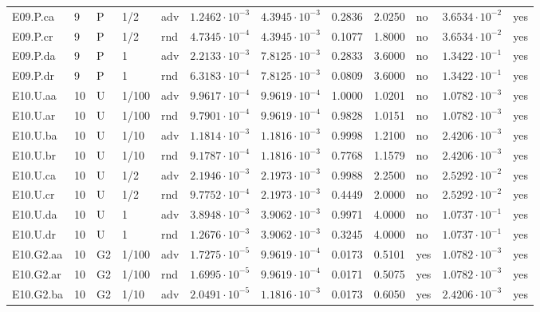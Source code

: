 {\begin{longtable}{@{}lllllllllll l@{}}
E09.P.ca & 9 & P & 1/2 & adv & $1.2462\cdot 10^{-3}$ & $4.3945\cdot 10^{-3}$ & 0.2836 & 2.0250 & no & $3.6534\cdot 10^{-2}$ & yes \\
E09.P.cr & 9 & P & 1/2 & rnd & $4.7345\cdot 10^{-4}$ & $4.3945\cdot 10^{-3}$ & 0.1077 & 1.8000 & no & $3.6534\cdot 10^{-2}$ & yes \\
E09.P.da & 9 & P & 1 & adv & $2.2133\cdot 10^{-3}$ & $7.8125\cdot 10^{-3}$ & 0.2833 & 3.6000 & no & $1.3422\cdot 10^{-1}$ & yes \\
E09.P.dr & 9 & P & 1 & rnd & $6.3183\cdot 10^{-4}$ & $7.8125\cdot 10^{-3}$ & 0.0809 & 3.6000 & no & $1.3422\cdot 10^{-1}$ & yes \\
E10.U.aa & 10 & U & 1/100 & adv & $9.9617\cdot 10^{-4}$ & $9.9619\cdot 10^{-4}$ & 1.0000 & 1.0201 & no & $1.0782\cdot 10^{-3}$ & yes \\
E10.U.ar & 10 & U & 1/100 & rnd & $9.7901\cdot 10^{-4}$ & $9.9619\cdot 10^{-4}$ & 0.9828 & 1.0151 & no & $1.0782\cdot 10^{-3}$ & yes \\
E10.U.ba & 10 & U & 1/10 & adv & $1.1814\cdot 10^{-3}$ & $1.1816\cdot 10^{-3}$ & 0.9998 & 1.2100 & no & $2.4206\cdot 10^{-3}$ & yes \\
E10.U.br & 10 & U & 1/10 & rnd & $9.1787\cdot 10^{-4}$ & $1.1816\cdot 10^{-3}$ & 0.7768 & 1.1579 & no & $2.4206\cdot 10^{-3}$ & yes \\
E10.U.ca & 10 & U & 1/2 & adv & $2.1946\cdot 10^{-3}$ & $2.1973\cdot 10^{-3}$ & 0.9988 & 2.2500 & no & $2.5292\cdot 10^{-2}$ & yes \\
E10.U.cr & 10 & U & 1/2 & rnd & $9.7752\cdot 10^{-4}$ & $2.1973\cdot 10^{-3}$ & 0.4449 & 2.0000 & no & $2.5292\cdot 10^{-2}$ & yes \\
E10.U.da & 10 & U & 1 & adv & $3.8948\cdot 10^{-3}$ & $3.9062\cdot 10^{-3}$ & 0.9971 & 4.0000 & no & $1.0737\cdot 10^{-1}$ & yes \\
E10.U.dr & 10 & U & 1 & rnd & $1.2676\cdot 10^{-3}$ & $3.9062\cdot 10^{-3}$ & 0.3245 & 4.0000 & no & $1.0737\cdot 10^{-1}$ & yes \\
E10.G2.aa & 10 & G2 & 1/100 & adv & $1.7275\cdot 10^{-5}$ & $9.9619\cdot 10^{-4}$ & 0.0173 & 0.5101 & yes & $1.0782\cdot 10^{-3}$ & yes \\
E10.G2.ar & 10 & G2 & 1/100 & rnd & $1.6995\cdot 10^{-5}$ & $9.9619\cdot 10^{-4}$ & 0.0171 & 0.5075 & yes & $1.0782\cdot 10^{-3}$ & yes \\
E10.G2.ba & 10 & G2 & 1/10 & adv & $2.0491\cdot 10^{-5}$ & $1.1816\cdot 10^{-3}$ & 0.0173 & 0.6050 & yes & $2.4206\cdot 10^{-3}$ & yes \\

\end{longtable}}
